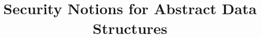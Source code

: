 \newcommand{\ExpPrivOW}[2]{\mathrm{\Exp}^{\mathrm{ow\mbox{-}rep}}_{#1}(#2)}
\newcommand{\AdvPrivOW}[2]{\mathrm{\Adv}^{\mathrm{ow\mbox{-}rep}}_{#1}(#2)}
\newcommand{\ExpPrivSS}[2]{\mathrm{\Exp}^{\mathrm{ss\mbox{-}rep}}_{#1}(#2)}
\newcommand{\ExpPrivSSreal}[2]{\mathrm{\Exp}^{\mathrm{ss\mbox{-}rep\mbox{-}1}}_{#1}(#2)}
\newcommand{\ExpPrivSSsim}[2]{\mathrm{\Exp}^{\mathrm{ss\mbox{-}rep\mbox{-}0}}_{#1}(#2)}
\newcommand{\AdvPrivSS}[2]{\mathrm{\Adv}^{\mathrm{ss\mbox{-}rep}}_{#1}(#2)}

\newcommand{\distr}[2]{\mathcal{D}_{#1}^{#2}}
\newcommand{\univ}{\calU}
\newcommand{\Perm}[1]{\mathrm{Perm}(#1)}
\newcommand{\Func}[1]{\mathrm{Func}(#1)}
\newcommand{\win}{\mathrm{win}}
\newcommand{\err}{\mathrm{err}}
\newcommand{\Ans}{\mathrm{Ans}}
\newcommand{\Break}{\mathrm{break}}
\newcommand{\setprim}{\Pi}
\newcommand{\finalshare}{\mathrm{finalshare}}
\newcommand{\emptyslot}{\mathrm{emptyslot}}
\def\pub{{\sf pub}}
\def\aux{{\sf aux}}
\def\pubaux{{\sf pub}}
\def\privaux{{\sf priv}}
\newcommand{\bilin}{\mathrm{bi}\mbox{-}\mathrm{lin}}

\title{{\bf Security Notions for Abstract Data Structures}}
\date{}

\maketitle


\begin{abstract}
\centering
%
\end{abstract}




%

\appendix












